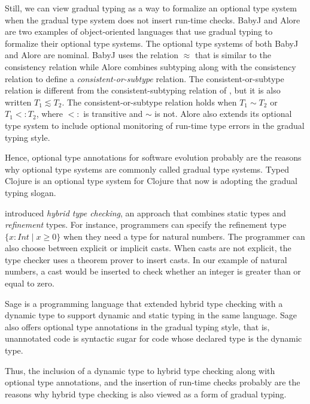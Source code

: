 Still, we can view gradual typing as a way to formalize an optional
type system when the gradual type system does not insert run-time
checks.
BabyJ \citep{anderson2003babyj} and Alore \citep{lehtosalo2011alore}
are two examples of object-oriented languages that use gradual
typing to formalize their optional type systems.
The optional type systems of both BabyJ and Alore are nominal.
BabyJ uses the relation $\approx$ that is similar to the consistency
relation while Alore combines  subtyping along with the consistency
relation to define a \emph{consistent-or-subtype} relation.
The consistent-or-subtype relation is different from the
consistent-subtyping relation of \citet{siek2007objects}, but it is
also written $T_{1} \lesssim T_{2}$.
The consistent-or-subtype relation holds when $T_{1} \sim T_{2}$
or $T_{1} <: T_{2}$, where $<:$ is transitive and $\sim$ is not.
Alore also extends its optional type system to include optional
monitoring of run-time type errors in the gradual typing style.

Hence, optional type annotations for software evolution probably are
the reasons why optional type systems are commonly called
gradual type systems.
Typed Clojure \citep{bonnaire-sergeant2012typed-clojure} is an
optional type system for Clojure that now is adopting the
gradual typing slogan.

\citet{flanagan2006htc} introduced \emph{hybrid type checking},
an approach that combines static types and \emph{refinement} types.
For instance, programmers can specify the refinement type
$\{x:Int \;|\; x \ge 0\}$ when they need a type for natural numbers.
The programmer can also choose between explicit or implicit casts.
When casts are not explicit, the type checker uses a theorem prover
to insert casts.
In our example of natural numbers, a cast would be inserted to check
whether an integer is greater than or equal to zero.

Sage \citep{gronski2006sage} is a programming language that
extended hybrid type checking with a dynamic type to
support dynamic and static typing in the same language.
Sage also offers optional type annotations in the gradual typing
style, that is, unannotated code is syntactic sugar for
code whose declared type is the dynamic type.

Thus, the inclusion of a dynamic type to hybrid type checking
along with optional type annotations, and the insertion of run-time
checks probably are the reasons why hybrid type checking is
also viewed as a form of gradual typing.

